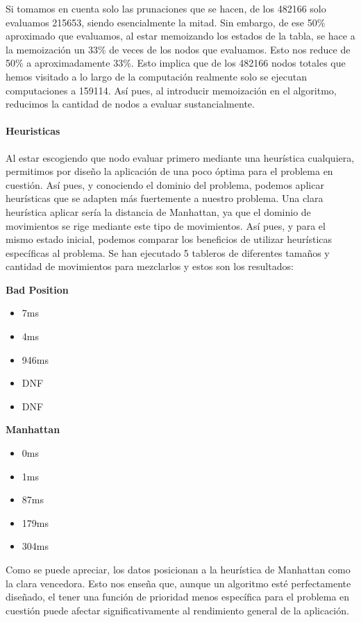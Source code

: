 Si tomamos en cuenta solo las prunaciones que se hacen, de los 482166 solo evaluamos 215653, siendo esencialmente la mitad. Sin embargo, de ese 50\% aproximado que evaluamos, al estar memoizando los estados de la tabla, se hace  a la memoización un 33\% de veces de los nodos que evaluamos. Esto nos reduce de 50\% a aproximadamente 33\%. Esto implica que de los 482166 nodos totales que hemos visitado a lo largo de la computación realmente solo se ejecutan computaciones a 159114. Así pues, al introducir memoización en el algoritmo, reducimos la cantidad de nodos a evaluar sustancialmente.\\
    
\paragraph{Heuristicas}
Al estar escogiendo que nodo evaluar primero mediante una heurística cualquiera, permitimos por diseño la aplicación de una poco óptima para el problema en cuestión. Así pues, y conociendo el dominio del problema, podemos aplicar heurísticas que se adapten más fuertemente a nuestro problema. Una clara heurística aplicar sería la distancia de Manhattan, ya que el dominio de movimientos se rige mediante este tipo de movimientos. Así pues, y para el mismo estado inicial, podemos comparar los beneficios de utilizar heurísticas específicas al problema. Se han ejecutado 5 tableros de diferentes tamaños y cantidad de movimientos para mezclarlos y estos son los resultados: 

\begin{multicols}{2}
\textbf{Bad Position}
\begin{itemize}
    \item 7ms
    \item 4ms
    \item 946ms
    \item DNF
    \item DNF
\end{itemize}
\vfill
\null
\columnbreak
\textbf{Manhattan}
\begin{itemize}
    \item 0ms 
    \item 1ms 
    \item 87ms 
    \item 179ms
    \item 304ms 
\end{itemize}
\vfill
\null
\end{multicols}

Como se puede apreciar, los datos posicionan a la heurística de Manhattan como la clara vencedora. Esto nos enseña que, aunque un algoritmo esté perfectamente diseñado, el tener una función de prioridad menos específica para el problema en cuestión puede afectar significativamente al rendimiento general de la aplicación.
